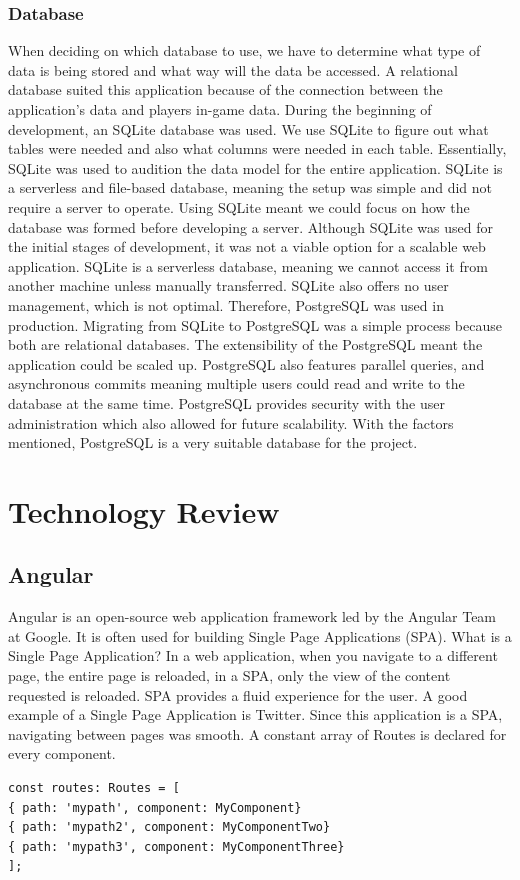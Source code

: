 \subsection{Database}
When deciding on which database to use, we have to determine what type of data is being stored and what way will the data be accessed. A relational database suited this application because of the connection between the application's data and players in-game data. During the beginning of development, an SQLite database was used. We use SQLite to figure out what tables were needed and also what columns were needed in each table. Essentially, SQLite was used to audition the data model for the entire application. SQLite is a serverless and file-based database, meaning the setup was simple and did not require a server to operate. Using SQLite meant we could focus on how the database was formed before developing a server. Although SQLite was used for the initial stages of development, it was not a viable option for a scalable web application. SQLite is a serverless database, meaning we cannot access it from another machine unless manually transferred. SQLite also offers no user management, which is not optimal. Therefore, PostgreSQL was used in production. Migrating from SQLite to PostgreSQL was a simple process because both are relational databases. The extensibility of the PostgreSQL meant the application could be scaled up. PostgreSQL also features parallel queries, and asynchronous commits meaning multiple users could read and write to the database at the same time. PostgreSQL provides security with the user administration which also allowed for future scalability. With the factors mentioned, PostgreSQL is a very suitable database for the project.




\chapter{Technology Review}
\section{Angular}
Angular is an open-source web application framework led by the Angular Team at Google. It is often used for building Single Page Applications (SPA). What is a Single Page Application? In a web application, when you navigate to a different page, the entire page is reloaded, in a SPA, only the view of the content requested is reloaded. SPA provides a fluid experience for the user. A good example of a Single Page Application is Twitter. Since this application is a SPA, navigating between pages was smooth. A constant array of Routes is declared for every component.
\begin{verbatim}
const routes: Routes = [
{ path: 'mypath', component: MyComponent}
{ path: 'mypath2', component: MyComponentTwo}
{ path: 'mypath3', component: MyComponentThree}
];
\end{verbatim}

